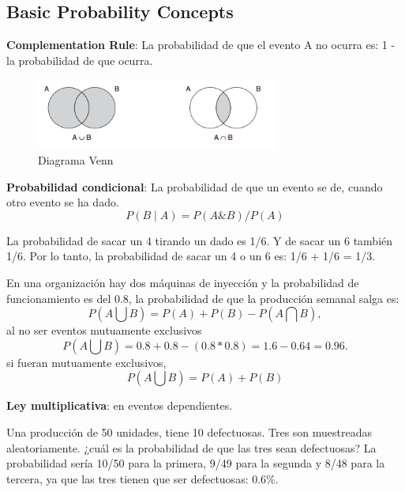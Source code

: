 \documentclass[]{article}
\begin{document}
\subsection{Basic Probability Concepts}

\textbf{Complementation Rule}: La probabilidad de que el evento A no ocurra es: 1 - la probabilidad de que ocurra. 

\begin{figure}[ht!]
	\centering
	\includegraphics[width=80mm]{imagenes/DiagramaVenn.png}
	\caption{Diagrama Venn}
	\label{fig:DiagramaVenn}
\end{figure}

\textbf{Probabilidad condicional}: La probabilidad de que un evento se de, cuando otro evento se ha dado. \begin{equation} P(B\mid A) = P(A \& B)/P(A) \end{equation}

La probabilidad de sacar un 4 tirando un dado es 1/6. Y de sacar un 6 también 1/6. Por lo tanto, la probabilidad de sacar un 4 o un 6 es: 1/6 + 1/6 = 1/3.

En una organización hay dos máquinas de inyección y la probabilidad de funcionamiento es del 0.8, la probabilidad de que la producción semanal salga es:  
\begin{equation} P(A \bigcup B) = P(A) + P(B) - P(A \bigcap B), \end{equation}al no ser eventos mutuamente exclusivos \begin{equation}  P(A \bigcup B) = 0.8 + 0.8 - (0.8 * 0.8) = 1.6 - 0.64 = 0.96. \end{equation} si fueran mutuamente exclusivos, \begin{equation} P(A \bigcup B) = P(A) + P(B) \end{equation}

\textbf{Ley multiplicativa}: en eventos dependientes.

Una producción de 50 unidades, tiene 10 defectuosas. Tres son muestreadas aleatoriamente. ¿cuál es la probabilidad de que las tres sean defectuosas?
La probabilidad sería 10/50 para la primera, 9/49 para la segunda y 8/48 para la tercera, ya que las tres tienen que ser defectuosas: 0.6\%.
\end{document}
